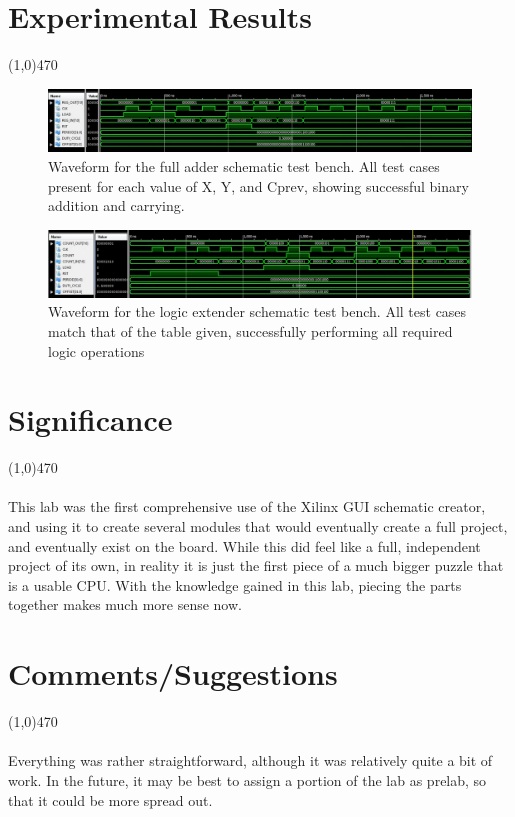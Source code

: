 \documentclass[12pt]{article}
\begin{document}
		
		
			
\section{Experimental Results}\vspace{-.7cm} \line(1,0){470}

\begin{figure}[h]
    \centering
	\includegraphics[scale=.34]{reg_tb_wave.png}
	\caption{Waveform for the full adder schematic test bench. All test cases present for each value of X, Y, and Cprev, showing successful binary addition and carrying.}
\end{figure}

\begin{figure}[h]
    \centering
	\includegraphics[scale=.34]{counter_tb_wave.png}
	\caption{Waveform for the logic extender schematic test bench. All test cases match that of the table given, successfully performing all required logic operations}
\end{figure}




	\newpage
\section{Significance} \vspace{-.7cm} \line(1,0){470}
	\paragraph{}
		This lab was the first comprehensive use of the Xilinx GUI schematic creator, and using it to create several modules that would eventually create a full project, and eventually exist on the board. While this did feel like a full, independent project of its own, in reality it is just the first piece of a much bigger puzzle that is a usable CPU. With the knowledge gained in this lab, piecing the parts together makes much more sense now. 

 \section{Comments/Suggestions}\vspace{-.7cm} \line(1,0){470}
 	\paragraph{}
		Everything was rather straightforward, although it was relatively quite a bit of work. In the future, it may be best to assign a portion of the lab as prelab, so that it could be more spread out.
		
\end{document}
